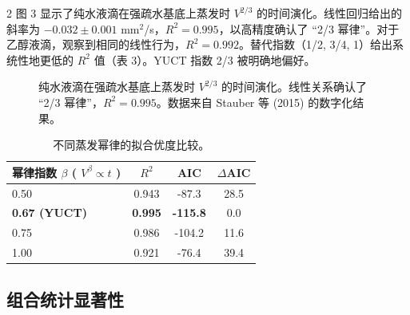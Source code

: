 \documentclass[11pt,a4paper]{article}
\begin{document}
\begin{multicols}{2}
		图 3 显示了纯水液滴在强疏水基底上蒸发时 \(V^{2/3}\) 的时间演化。线性回归给出的斜率为 \(-0.032 \pm 0.001\) mm\(^2\)/s，\(R^2 = 0.995\)，以高精度确认了 “2/3 幂律”。对于乙醇液滴，观察到相同的线性行为，\(R^2 = 0.992\)。替代指数（1/2, 3/4, 1）给出系统性地更低的 \(R^2\) 值（表 3）。YUCT 指数 2/3 被明确地偏好。
		
		\begin{figure}[htbp]
			\centering
			\caption{纯水液滴在强疏水基底上蒸发时 \(V^{2/3}\) 的时间演化。线性关系确认了 “2/3 幂律”，\(R^2 = 0.995\)。数据来自 Stauber 等 (2015) \cite{Stauber2015} 的数字化结果。}
			\label{fig:evaporation}
		\end{figure}
		
		\begin{table}[htbp]
			\centering
			\caption{不同蒸发幂律的拟合优度比较。}
			\label{tab:evaporation}
			\begin{tabular}{lccc}
				\toprule
				\textbf{幂律指数 $\beta$ ( $V^{\beta} \propto t$ )} & $R^2$ & AIC & $\Delta$AIC \\
				\midrule
				0.50 & 0.943 & -87.3 & 28.5 \\
				\textbf{0.67 (YUCT)} & \textbf{0.995} & \textbf{-115.8} & 0.0 \\
				0.75 & 0.986 & -104.2 & 11.6 \\
				1.00 & 0.921 & -76.4 & 39.4 \\
				\bottomrule
			\end{tabular}
		\end{table}
		
		\subsection{组合统计显著性}
		

\end{multicols}
\end{document}
